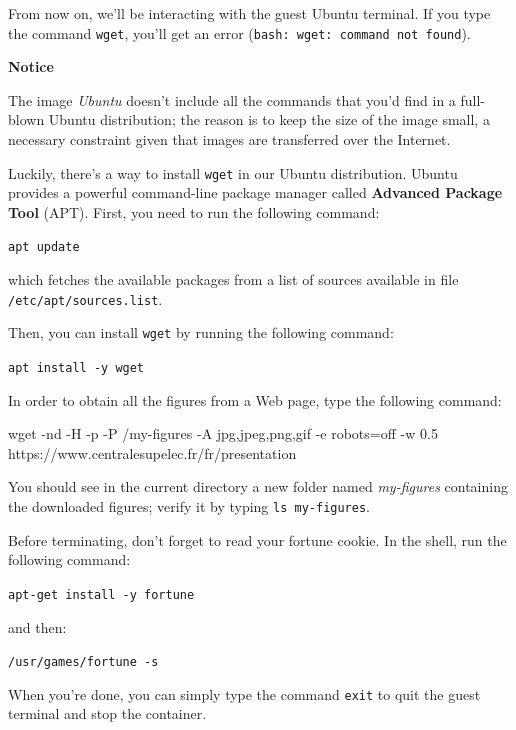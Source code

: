 \documentclass[
]{article}
\newenvironment{Shaded}{\begin{snugshade}}{\end{snugshade}}
\newcommand{\NormalTok}[1]{#1}
\newenvironment{infobox}[1]
  {
  \begin{itemize}
  \renewcommand{\labelitemi}{
    \raisebox{-.7\height}[0pt][0pt]{
      
    }
  }
  \setlength{\fboxsep}{1em}
  \begin{whitebox}
  \item
  }
  {
  \end{whitebox}
  \end{itemize}
  }
\theoremstyle{definition}
\theoremstyle{definition}
\theoremstyle{definition}
\theoremstyle{remark}
\begin{document}
From now on, we'll be interacting with the guest Ubuntu terminal.
If you type the command \texttt{wget},
you'll get an error (\texttt{bash:\ wget:\ command\ not\ found}).

\begin{infobox}{warning}
\textbf{Notice}

The image \emph{Ubuntu} doesn't include all the commands that you'd find
in a full-blown Ubuntu distribution;
the reason is to keep the size of the image small,
a necessary constraint given that
images are transferred over the Internet.

\end{infobox}

Luckily, there's a way to install \texttt{wget} in our Ubuntu distribution.
Ubuntu provides a powerful command-line package manager called
\textbf{Advanced Package Tool} (APT).
First, you need to run the following command:

\texttt{apt\ update}

which fetches the available packages from a list of sources
available in file \texttt{/etc/apt/sources.list}.

Then, you can install \texttt{wget} by running the following command:

\texttt{apt\ install\ -y\ wget}

In order to obtain all the figures from a
Web page, type the following command:

\begin{Shaded}
\begin{Highlighting}[]
\NormalTok{wget {-}nd {-}H {-}p {-}P /my{-}figures {-}A jpg,jpeg,png,gif {-}e robots=off {-}w 0.5 https://www.centralesupelec.fr/fr/presentation}
\end{Highlighting}
\end{Shaded}

You should see in the current directory a new folder
named \emph{my-figures} containing the downloaded figures;
verify it by typing \texttt{ls\ my-figures}.

Before terminating, don't forget to read your fortune cookie.
In the shell, run the following command:

\texttt{apt-get\ install\ -y\ fortune}

and then:

\texttt{/usr/games/fortune\ -s}

When you're done, you can simply type the command \texttt{exit} to quit
the guest terminal and stop the container.
\end{document}
